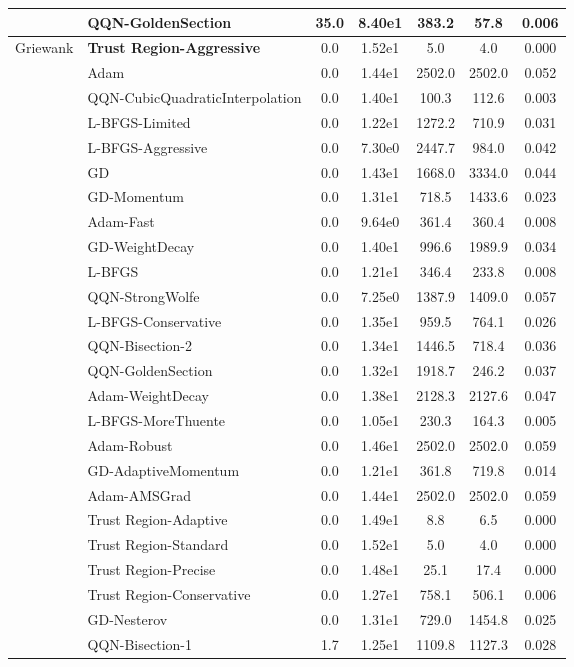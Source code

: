 \documentclass{article}
\begin{document}
\begin{table}[htbp]
{\begin{tabular}{p{2.5cm}p{2.5cm}*{5}{c}}
 & QQN-GoldenSection & 35.0 & 8.40e1 & 383.2 & 57.8 & 0.006 \\
\midrule
\multirow{25}{*}{Griewank} & \textbf{Trust Region-Aggressive} & 0.0 & 1.52e1 & 5.0 & 4.0 & 0.000 \\
 & Adam & 0.0 & 1.44e1 & 2502.0 & 2502.0 & 0.052 \\
 & QQN-CubicQuadraticInterpolation & 0.0 & 1.40e1 & 100.3 & 112.6 & 0.003 \\
 & L-BFGS-Limited & 0.0 & 1.22e1 & 1272.2 & 710.9 & 0.031 \\
 & L-BFGS-Aggressive & 0.0 & 7.30e0 & 2447.7 & 984.0 & 0.042 \\
 & GD & 0.0 & 1.43e1 & 1668.0 & 3334.0 & 0.044 \\
 & GD-Momentum & 0.0 & 1.31e1 & 718.5 & 1433.6 & 0.023 \\
 & Adam-Fast & 0.0 & 9.64e0 & 361.4 & 360.4 & 0.008 \\
 & GD-WeightDecay & 0.0 & 1.40e1 & 996.6 & 1989.9 & 0.034 \\
 & L-BFGS & 0.0 & 1.21e1 & 346.4 & 233.8 & 0.008 \\
 & QQN-StrongWolfe & 0.0 & 7.25e0 & 1387.9 & 1409.0 & 0.057 \\
 & L-BFGS-Conservative & 0.0 & 1.35e1 & 959.5 & 764.1 & 0.026 \\
 & QQN-Bisection-2 & 0.0 & 1.34e1 & 1446.5 & 718.4 & 0.036 \\
 & QQN-GoldenSection & 0.0 & 1.32e1 & 1918.7 & 246.2 & 0.037 \\
 & Adam-WeightDecay & 0.0 & 1.38e1 & 2128.3 & 2127.6 & 0.047 \\
 & L-BFGS-MoreThuente & 0.0 & 1.05e1 & 230.3 & 164.3 & 0.005 \\
 & Adam-Robust & 0.0 & 1.46e1 & 2502.0 & 2502.0 & 0.059 \\
 & GD-AdaptiveMomentum & 0.0 & 1.21e1 & 361.8 & 719.8 & 0.014 \\
 & Adam-AMSGrad & 0.0 & 1.44e1 & 2502.0 & 2502.0 & 0.059 \\
 & Trust Region-Adaptive & 0.0 & 1.49e1 & 8.8 & 6.5 & 0.000 \\
 & Trust Region-Standard & 0.0 & 1.52e1 & 5.0 & 4.0 & 0.000 \\
 & Trust Region-Precise & 0.0 & 1.48e1 & 25.1 & 17.4 & 0.000 \\
 & Trust Region-Conservative & 0.0 & 1.27e1 & 758.1 & 506.1 & 0.006 \\
 & GD-Nesterov & 0.0 & 1.31e1 & 729.0 & 1454.8 & 0.025 \\
 & QQN-Bisection-1 & 1.7 & 1.25e1 & 1109.8 & 1127.3 & 0.028 \\

\end{tabular}}
\end{table}
\end{document}
